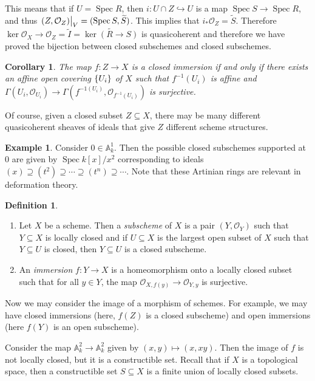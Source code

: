 \documentclass[leqno, openany]{memoir}
\newtheorem{cor}[thm]{Corollary}
\theoremstyle{definition}
\newtheorem{defn}[thm]{Definition}
\newtheorem{exm}[thm]{Example}
\theoremstyle{remark}
\theoremstyle{plain}
\theoremstyle{definition}
\theoremstyle{remark}
\newcommand{\A}{\mathbb{A}}
\newcommand{\mc}[1]{\mathcal{#1}}
\newcommand{\wt}[1]{\widetilde{#1}}
\DeclareMathOperator{\Spec}{Spec}
\begin{document}
This means that if $U = \Spec R$, then $i \colon U \cap Z \hookrightarrow U$ is a map $\Spec S \to \Spec R$, and thus $\eval{ (Z, \mc{O}_Z) }_V = (\Spec S, \wt{S})$. This implies that $i_* \mc{O}_Z = \wt{S}$. Therefore $\ker \mc{O}_X \to \mc{O}_Z = \wt{I} = \wt{\ker (R \to S)}$ is quasicoherent and therefore we have proved the bijection between closed subschemes and closed subschemes.

\begin{cor}
    The map $f \colon Z \to X$ is a closed immersion if and only if there exists an affine open covering $\qty{U_i}$ of $X$ such that $f^{-1}(U_i)$ is affine and $\Gamma(U_i, \mc{O}_{U_i}) \to \Gamma(f^{-1(U_i)}, \mc{O}_{f^{-1}(U_i)})$ is surjective.
\end{cor}

Of course, given a closed subset $Z \subseteq X$, there may be many different quasicoherent sheaves of ideals that give $Z$ different scheme structures.

\begin{exm}
    Consider $0 \in \A^1_k$. Then the possible closed subschemes supported at $0$ are given by $\Spec k[x]/x^2$ corresponding to ideals $(x) \supseteq (t^2) \supseteq \cdots \supseteq (t^n) \supseteq \cdots$. Note that these Artinian rings are relevant in deformation theory.
\end{exm}

\begin{defn}
    \begin{enumerate}
        \item Let $X$ be a scheme. Then a \textit{subscheme} of $X$ is a pair $(Y, \mc{O}_Y)$ such that $Y \subseteq X$ is locally closed and if $U \subseteq X$ is the largest open subset of $X$ such that $Y \subseteq U$ is closed, then $Y \subseteq U$ is a closed subscheme.
        \item An \textit{immersion} $f \colon Y \to X$ is a homeomorphism onto a locally closed subset such that for all $y \in Y$, the map $\mc{O}_{X,f(y)} \to \mc{O}_{Y,y}$ is surjective.
    \end{enumerate}
\end{defn}

Now we may consider the image of a morphism of schemes. For example, we may have closed immersions (here, $f(Z)$ is a closed subscheme) and open immersions (here $f(Y)$ is an open subscheme).

Consider the map $\A^2_k \to \A^2_k$ given by $(x,y) \mapsto (x, xy)$. Then the image of $f$ is not locally closed, but it is a constructible set. Recall that if $X$ is a topological space, then a constructible set $S \subseteq X$ is a finite union of locally closed subsets.
\end{document}
